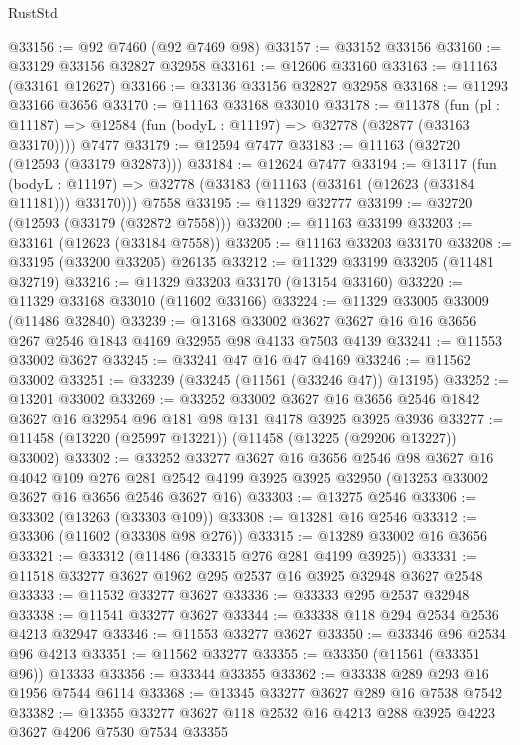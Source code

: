 \begin{lexlean}{RustStd}
\begin{coremodule}
@33156 := @92 @7460 (@92 @7469 @98)
@33157 := @33152 @33156
@33160 := @33129 @33156 @32827 @32958
@33161 := @12606 @33160
@33163 := @11163 (@33161 @12627)
@33166 := @33136 @33156 @32827 @32958
@33168 := @11293 @33166 @3656
@33170 := @11163 @33168 @33010
@33178 := @11378
    (fun (pl : @11187) => @12584 (fun (bodyL : @11197) => @32778 (@32877 (@33163 @33170))))
    @7477
@33179 := @12594 @7477
@33183 := @11163 (@32720 (@12593 (@33179 @32873)))
@33184 := @12624 @7477
@33194 := @13117
    (fun (bodyL : @11197) => @32778 (@33183 (@11163 (@33161 (@12623 (@33184 @11181))) @33170)))
    @7558
@33195 := @11329 @32777
@33199 := @32720 (@12593 (@33179 (@32872 @7558)))
@33200 := @11163 @33199
@33203 := @33161 (@12623 (@33184 @7558))
@33205 := @11163 @33203 @33170
@33208 := @33195 (@33200 @33205) @26135
@33212 := @11329 @33199 @33205 (@11481 @32719)
@33216 := @11329 @33203 @33170 (@13154 @33160)
@33220 := @11329 @33168 @33010 (@11602 @33166)
@33224 := @11329 @33005 @33009 (@11486 @32840)
@33239 := @13168
    @33002
    @3627
    @3627
    @16
    @16
    @3656
    @267
    @2546
    @1843
    @4169
    @32955
    @98
    @4133
    @7503
    @4139
@33241 := @11553 @33002 @3627
@33245 := @33241 @47 @16 @47 @4169
@33246 := @11562 @33002
@33251 := @33239 (@33245 (@11561 (@33246 @47)) @13195)
@33252 := @13201 @33002
@33269 := @33252
    @33002
    @3627
    @16
    @3656
    @2546
    @1842
    @3627
    @16
    @32954
    @96
    @181
    @98
    @131
    @4178
    @3925
    @3925
    @3936
@33277 := @11458 (@13220 (@25997 @13221)) (@11458 (@13225 (@29206 @13227)) @33002)
@33302 := @33252
    @33277
    @3627
    @16
    @3656
    @2546
    @98
    @3627
    @16
    @4042
    @109
    @276
    @281
    @2542
    @4199
    @3925
    @3925
    @32950
    (@13253 @33002 @3627 @16 @3656 @2546 @3627 @16)
@33303 := @13275 @2546
@33306 := @33302 (@13263 (@33303 @109))
@33308 := @13281 @16 @2546
@33312 := @33306 (@11602 (@33308 @98 @276))
@33315 := @13289 @33002 @16 @3656
@33321 := @33312 (@11486 (@33315 @276 @281 @4199 @3925))
@33331 := @11518 @33277 @3627 @1962 @295 @2537 @16 @3925 @32948 @3627 @2548
@33333 := @11532 @33277 @3627
@33336 := @33333 @295 @2537 @32948
@33338 := @11541 @33277 @3627
@33344 := @33338 @118 @294 @2534 @2536 @4213 @32947
@33346 := @11553 @33277 @3627
@33350 := @33346 @96 @2534 @96 @4213
@33351 := @11562 @33277
@33355 := @33350 (@11561 (@33351 @96)) @13333
@33356 := @33344 @33355
@33362 := @33338 @289 @293 @16 @1956 @7544 @6114
@33368 := @13345 @33277 @3627 @289 @16 @7538 @7542
@33382 := @13355 @33277 @3627 @118 @2532 @16 @4213 @288 @3925 @4223 @3627 @4206 @7530 @7534 @33355

\end{coremodule}
\end{lexlean}
